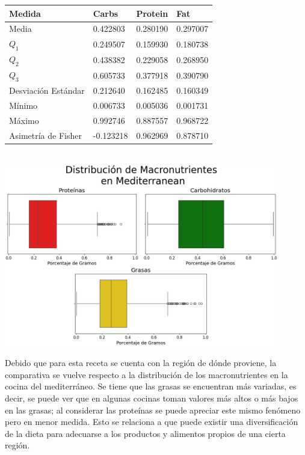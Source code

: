 \documentclass[12pt,a4paper]{article}
\begin{document}
{{{            \begin{center}
                \begin{tabular}{l|lll}
                    \toprule
                        Medida & Carbs & Protein & Fat \\
                    \midrule
                        Media               & 0.422803 & 0.280190 & 0.297007 \\
                        $Q_1$               & 0.249507 & 0.159930 & 0.180738 \\
                        $Q_2$               & 0.438382 & 0.229058 & 0.268950 \\
                        $Q_3$               & 0.605733 & 0.377918 & 0.390790 \\
                        Desviación Estándar & 0.212640 & 0.162485 & 0.160349 \\
                        Mínimo              & 0.006733 & 0.005036 & 0.001731 \\
                        Máximo              & 0.992746 & 0.887557 & 0.968722 \\
                        Asimetría de Fisher & -0.123218 & 0.962969 & 0.878710 \\
                    \bottomrule
                \end{tabular}\\
                \vspace{0.5cm}
                \includegraphics[width=0.9\textwidth]{Resources/EDA/Mediterranean_1.png}
            \end{center}       

            Debido que para esta receta se cuenta con la región de dónde proviene, la 
            comparativa se vuelve respecto a la distribución de los macronutrientes en 
            la cocina del mediterráneo. Se tiene que las grasas se encuentran más variadas, 
            es decir, se puede ver que en 
            algunas cocinas toman valores más altos o más bajos en las grasas; al considerar 
            las proteínas se puede apreciar este mismo fenómeno pero en menor medida. Esto se relaciona 
            a que puede existir una diversificación de la dieta para adecuarse a los 
            productos y alimentos propios de una cierta región.

}}}
\end{document}
